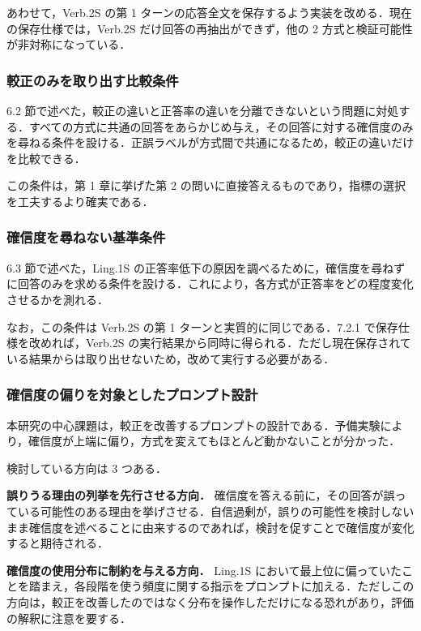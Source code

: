 あわせて，Verb.2S の第 1 ターンの応答全文を保存するよう実装を改める．現在の保存仕様では，Verb.2S だけ回答の再抽出ができず，他の 2 方式と検証可能性が非対称になっている．

\subsubsection{較正のみを取り出す比較条件}

6.2 節で述べた，較正の違いと正答率の違いを分離できないという問題に対処する．すべての方式に共通の回答をあらかじめ与え，その回答に対する確信度のみを尋ねる条件を設ける．正誤ラベルが方式間で共通になるため，較正の違いだけを比較できる．

この条件は，第 1 章に挙げた第 2 の問いに直接答えるものであり，指標の選択を工夫するより確実である．

\subsubsection{確信度を尋ねない基準条件}

6.3 節で述べた，Ling.1S の正答率低下の原因を調べるために，確信度を尋ねずに回答のみを求める条件を設ける．これにより，各方式が正答率をどの程度変化させるかを測れる．

なお，この条件は Verb.2S の第 1 ターンと実質的に同じである．7.2.1 で保存仕様を改めれば，Verb.2S の実行結果から同時に得られる．ただし現在保存されている結果からは取り出せないため，改めて実行する必要がある．

\subsubsection{確信度の偏りを対象としたプロンプト設計}

本研究の中心課題は，較正を改善するプロンプトの設計である．予備実験により，確信度が上端に偏り，方式を変えてもほとんど動かないことが分かった．

検討している方向は 3 つある．

\textbf{誤りうる理由の列挙を先行させる方向．} 確信度を答える前に，その回答が誤っている可能性のある理由を挙げさせる．自信過剰が，誤りの可能性を検討しないまま確信度を述べることに由来するのであれば，検討を促すことで確信度が変化すると期待される．

\textbf{確信度の使用分布に制約を与える方向．} Ling.1S において最上位に偏っていたことを踏まえ，各段階を使う頻度に関する指示をプロンプトに加える．ただしこの方向は，較正を改善したのではなく分布を操作しただけになる恐れがあり，評価の解釈に注意を要する．

